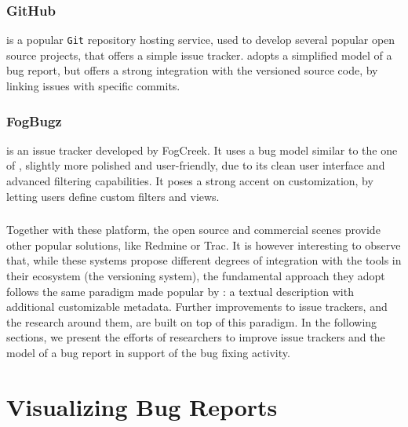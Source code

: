 \subsubsection{GitHub}
\gth{} is a popular \texttt{Git} repository hosting service, used to develop several popular open source projects, that offers a simple issue tracker. \gth adopts a simplified model of a bug report, but offers a strong integration with the versioned source code, by linking issues with specific commits.

\subsubsection{FogBugz}
\fbz{} is an issue tracker developed by FogCreek. It uses a bug model similar to the one of \bzilla, slightly more polished and user-friendly, due to its clean user interface and advanced filtering capabilities. It poses a strong accent on customization, by letting users define custom filters and views.

\subsubsection{} %
Together with these platform, the open source and commercial scenes provide other popular solutions, like Redmine or Trac.
It is however interesting to observe that, while these systems propose different degrees of integration with the tools in their ecosystem (\eg the versioning system), the fundamental approach they adopt follows the same paradigm made popular by \bzilla: a textual description with additional customizable metadata.
Further improvements to issue trackers, and the research around them, are built on top of this paradigm.
In the following sections, we present the efforts of researchers to improve issue trackers and the model of a bug report in support of the bug fixing activity.



\section{Visualizing Bug Reports}\label{sec:related-visualize} %


